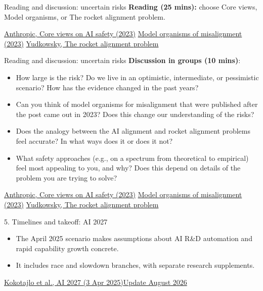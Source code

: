 \documentclass[aspectratio=169,11pt]{beamer}
\newcommand{\sources}[1]{\vfill{\fontsize{6.3}{7.5}\selectfont\color{muted}#1\par}}
\begin{document}
\begin{frame}[t,label=riskdiscussion]{Reading and discussion: uncertain risks}
\textbf{Reading (25 mins):} choose Core views, Model organisms, or The rocket alignment problem.

\sources{\href{https://www.anthropic.com/news/core-views-on-ai-safety}{Anthropic, Core views on AI safety (2023)} \quad \href{https://www.lesswrong.com/posts/ChDH335ckdvpxXaXX/model-organisms-of-misalignment-the-case-for-a-new-pillar-of-1}{Model organisms of misalignment (2023)} \quad \href{https://www.alignmentforum.org/posts/Gg9a4y8reWKtLe3Tn/the-rocket-alignment-problem}{Yudkowsky, The rocket alignment problem}}
\end{frame}

\begin{frame}[t,label=riskdiscussion]{Reading and discussion: uncertain risks}
\textbf{Discussion in groups (10 mins)}:
\begin{itemize}
\item How large is the risk? Do we live in an optimistic, intermediate, or pessimistic scenario? How has the evidence changed in the past years?  
\item Can you think of model organisms for misalignment that were published after the post came out in 2023? Does this change our understanding of the risks?  
\item Does the analogy between the AI alignment and rocket alignment problems feel accurate? In what ways does it or does it not?  
\item What safety approaches (e.g., on a spectrum from theoretical to empirical) feel most appealing to you, and why? Does this depend on details of the problem you are trying to solve?
\end{itemize}
\sources{\href{https://www.anthropic.com/news/core-views-on-ai-safety}{Anthropic, Core views on AI safety (2023)} \quad \href{https://www.lesswrong.com/posts/ChDH335ckdvpxXaXX/model-organisms-of-misalignment-the-case-for-a-new-pillar-of-1}{Model organisms of misalignment (2023)} \quad \href{https://www.alignmentforum.org/posts/Gg9a4y8reWKtLe3Tn/the-rocket-alignment-problem}{Yudkowsky, The rocket alignment problem}}
\end{frame}

\begin{frame}[t,label=forecast]{5. Timelines and takeoff: AI 2027}
\begin{itemize}\setlength{\itemsep}{3.5mm}
\item The April 2025 scenario makes assumptions about AI R\&D automation and rapid capability growth concrete.
\item It includes race and slowdown branches, with separate research supplements.
\end{itemize}
\sources{\href{https://ai-2027.com/}{Kokotajlo et al., AI 2027 (3 Apr 2025)}\quad \href{https://blog.aifutures.org/p/q25-2026-timelines-update-uplift}{Update August 2026}}

\end{frame}
\end{document}
